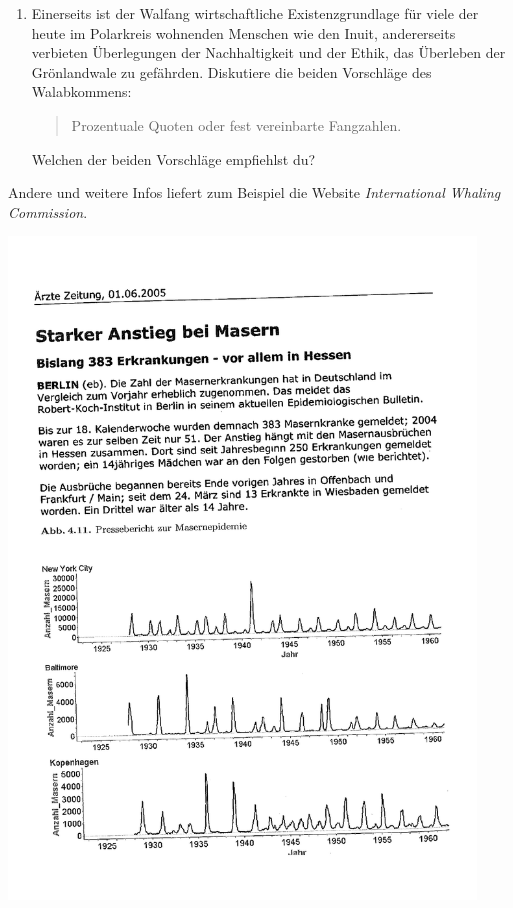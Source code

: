 \documentclass[%
11pt,%
twoside,%
titlepage,%
german,%
headsepline%
]{scrartcl}
\begin{document}
\begin{enumerate}
\item Einerseits ist der Walfang wirtschaftliche Existenzgrundlage für viele der heute im Polarkreis wohnenden Menschen wie den Inuit, andererseits verbieten Über\-le\-gun\-gen der Nachhaltigkeit und der Ethik, das Überleben der Grönlandwale zu gefährden. Diskutiere die beiden Vorschläge des Walabkommens:
\begin{quote}
Prozentuale Quoten oder fest vereinbarte Fangzahlen.
\end{quote}
Welchen der beiden Vorschläge empfiehlst du?
\end{enumerate}

Andere und weitere Infos liefert zum Beispiel die Website \emph{International Whaling Commission}.

\clearpage

\includegraphics[width=0.93\textwidth,page=1,angle=-1.6]{pictures/starkeranstiegzeitung.pdf}

\pagebreak
\end{document}
